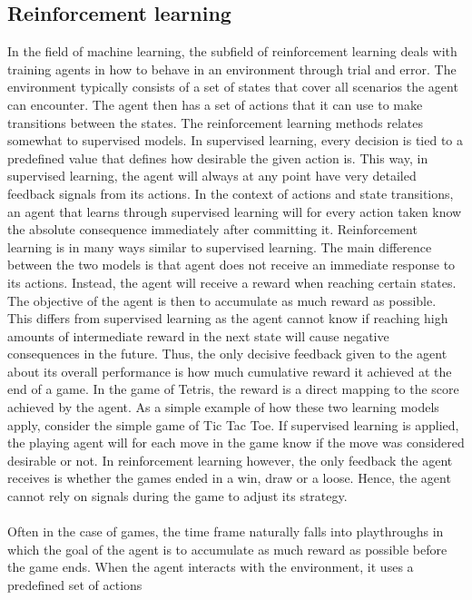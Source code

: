\subsection{Reinforcement learning \label{RL}}

In the field of machine learning, the subfield of reinforcement learning
deals with training agents in how to behave in an environment through
trial and error. The environment typically consists of a set of states that cover all
scenarios the agent can encounter. The agent then has a set of actions
that it can use to make transitions between the states. 
The reinforcement learning methods relates somewhat 
to supervised models.
In supervised learning, every decision is tied to a predefined value
that defines how desirable the given action is. This way, in supervised learning,
the agent will always at any point have very detailed feedback signals from its actions.
In the context of actions and state transitions, an agent that learns through
supervised learning will for every action taken know the absolute consequence
immediately after committing it.
Reinforcement learning is in many ways similar to supervised learning. 
The main difference between the two models is that agent does not receive 
an immediate response to its actions. Instead, the agent will receive a reward
when reaching certain states. The objective of the agent is then to
accumulate as much reward as possible. This differs from supervised learning
as the agent cannot know if reaching high amounts of intermediate reward in the next state
will cause negative consequences in the future. Thus, the only decisive 
feedback given to the agent about its overall performance is 
how much cumulative reward it achieved at the end of a game.
In the game of Tetris, the reward is a direct mapping to 
the score achieved by the agent.
As a simple example of how these two learning models apply, consider 
the simple game of
Tic Tac Toe. If supervised learning
is applied, the playing agent will for each move in the game know
if the move was considered desirable or not. 
In reinforcement learning however, the only feedback the agent receives
is whether the games ended in a win, draw or a loose. Hence, the agent
cannot rely on signals during the game to adjust its strategy.\\
\\
Often in the case of games, the 
time frame naturally falls into playthroughs in which the 
goal of the agent is to accumulate as much reward as possible 
before the game ends.
When the agent interacts 
with the environment, it uses a predefined set of actions

